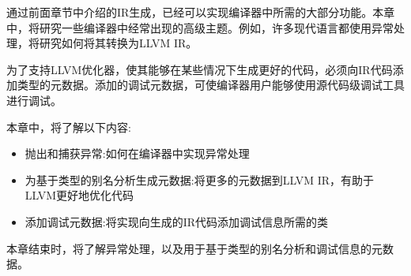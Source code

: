
通过前面章节中介绍的IR生成，已经可以实现编译器中所需的大部分功能。本章中，将研究一些编译器中经常出现的高级主题。例如，许多现代语言都使用异常处理，将研究如何将其转换为LLVM IR。

为了支持LLVM优化器，使其能够在某些情况下生成更好的代码，必须向IR代码添加类型的元数据。添加的调试元数据，可使编译器用户能够使用源代码级调试工具进行调试。

本章中，将了解以下内容:

\begin{itemize}
\item
抛出和捕获异常:如何在编译器中实现异常处理

\item
为基于类型的别名分析生成元数据:将更多的元数据到LLVM IR，有助于LLVM更好地优化代码

\item
添加调试元数据:将实现向生成的IR代码添加调试信息所需的类
\end{itemize}

本章结束时，将了解异常处理，以及用于基于类型的别名分析和调试信息的元数据。






















